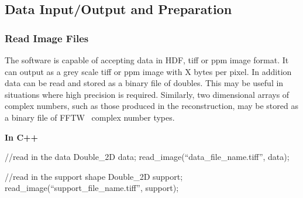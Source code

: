 \documentclass[]{nadia}
\begin{document}
\begin{comment}
                          {\bf In C++} 
                          \begin{myverbatim}[language=C++]
                            //Create a complex 2D field which will
                            //hold the result of the reconstruction.
                            Complex_2D object_estimate(nx,ny);
                            
                            //Create the planar CDI object which will
                            //be used to perform the reconstruction.
                            PlanarCDI planar(object_estimate);
                            
                            //set the support and intensity
                            planar.set_support(support,false);
                            planar.set_intensity(data);
                          \end{myverbatim}
                              {\bf In IDL}
                              \begin{myverbatim}[language=IDL]
                                NADIA_INIT_PLANAR, data, support
                              \end{myverbatim}
                        }
                          
\end{comment}

\subsection{Data Input/Output and Preparation}

\subsubsection{Read Image Files}

\label{subsec:read_images}

The software is capable of accepting data in HDF, tiff or ppm image
format. It can output as a grey scale tiff or ppm image with X bytes
per pixel. In addition data can be read and stored as a binary file of
doubles. This may be useful in situations where high precision is
required. Similarly, two dimensional arrays of complex numbers, such
as those produced in the reconstruction, may be stored as a binary
file of FFTW~\cite{fftw} complex number types.

{\bf In C++} 
\begin{myverbatim}[language=C++]
  //read in the data
  Double_2D data;
  read_image(``data_file_name.tiff'', data);
  
  //read in the support shape
  Double_2D support;
  read_image(``support_file_name.tiff'', support);
  \end{myverbatim}
\end{document}

